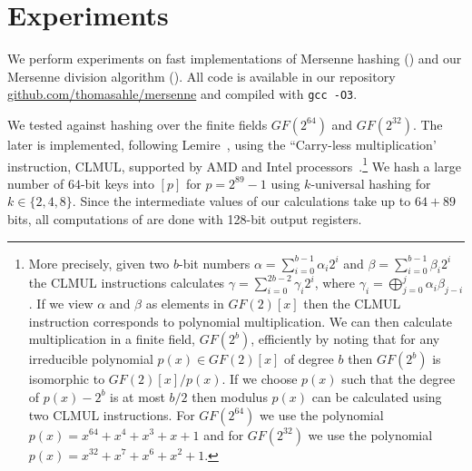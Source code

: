 \section{Experiments}\label{sec:experiments}
We perform experiments on fast implementations of Mersenne hashing () and our Mersenne division algorithm ().
All code is available in our repository\\\href{https://github.com/thomasahle/mersenne/}{github.com/thomasahle/mersenne} and compiled with \texttt{gcc -O3}.

We tested  against hashing over the finite fields $GF(2^{64})$ and $GF(2^{32})$.
The later is implemented, following Lemire~\cite{lemire2014strongly}, using the ``Carry-less multiplication' instruction, CLMUL, supported by AMD and Intel processors~\cite{GUERON2010549}.\footnote{
More precisely, given two $b$-bit numbers $\alpha = \sum_{i = 0}^{b - 1} \alpha_i 2^i$ and $\beta = \sum_{i = 0}^{b - 1} \beta_i 2^i$
the CLMUL instructions calculates $\gamma = \sum_{i = 0}^{2b - 2} \gamma_i 2^i$, where $\gamma_i = \bigoplus_{j = 0}^{j} \alpha_i \beta_{j - i}$.
If we view $\alpha$ and $\beta$ as elements in $GF(2)[x]$ then the CLMUL instruction corresponds to polynomial multiplication.
We can then calculate multiplication in a finite field, $GF(2^b)$, efficiently by noting that for any irreducible polynomial $p(x) \in GF(2)[x]$
of degree $b$ then $GF(2^b)$ is isomorphic to $GF(2)[x] / p(x)$. If we choose $p(x)$ such that the degree of $p(x) - 2^{b}$ is at
most $b/2$ then modulus $p(x)$ can be calculated using two CLMUL instructions.
For $GF(2^{64})$ we use the polynomial $p(x) = x^{64} + x^4 + x^3 + x + 1$ and for $GF(2^{32})$ we use the polynomial $p(x) = x^{32} + x^7 + x^6 + x^2 + 1$.
}
%
We hash a large number of $64$-bit keys into $[p]$ for $p=2^{89}-1$ using $k$-universal hashing for $k \in \{2, 4, 8\}$.
Since the intermediate values of our calculations take up to $64 + 89$ bits, all computations of  are done with 128-bit output registers.

